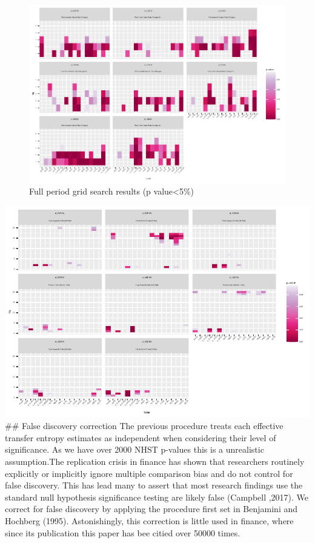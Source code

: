 \documentclass[
]{article}
\begin{document}
\begin{figure}
\centering
\includegraphics{working_paper_files/figure-latex/fullless5-1.pdf}
\caption{Full period grid search results (p value\textless5\%)}
\end{figure}

\includegraphics{working_paper_files/figure-latex/CE1-1.pdf} \#\# False
discovery correction The previous procedure treats each effective
transfer entropy estimates as independent when considering their level
of significance. As we have over 2000 NHST p-values this is a
unrealistic assumption.The replication crisis in finance has shown that
researchers routinely explicitly or implicitly ignore multiple
comparison bias and do not control for false discovery. This has lead
many to assert that most research findings use the standard null
hypothesis significance testing are likely false (Campbell ,2017). We
correct for false discovery by applying the procedure first set in
Benjamini and Hochberg (1995). Astonishingly, this correction is little
used in finance, where since its publication this paper has bee citied
over 50000 times.
\end{document}
